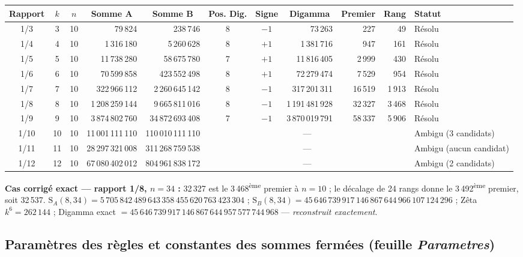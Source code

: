 \documentclass[11pt,a4paper]{article}
\newcommand{\SA}{\mathrm{S}_A}
\newcommand{\SB}{\mathrm{S}_B}
\begin{document}
\begin{center}\scriptsize
\setlength{\tabcolsep}{2pt}
\begin{tabular}{@{}c c c r r c c r r r l@{}}
\toprule
\rowcolor{spectralgris}
Rapport & $k$ & $n$ & \multicolumn{1}{c}{Somme A} & \multicolumn{1}{c}{Somme B} & Pos. Dig. & Signe & \multicolumn{1}{c}{Digamma} & \multicolumn{1}{c}{Premier} & Rang & Statut \\
\midrule
1/3 & 3 & 10 & 79\,824 & 238\,746 & 8 & $-1$ & 73\,263 & 227 & 49 & Résolu \\
1/4 & 4 & 10 & 1\,316\,180 & 5\,260\,628 & 8 & $+1$ & 1\,381\,716 & 947 & 161 & Résolu \\
1/5 & 5 & 10 & 11\,738\,280 & 58\,675\,780 & 7 & $+1$ & 11\,816\,405 & 2\,999 & 430 & Résolu \\
1/6 & 6 & 10 & 70\,599\,858 & 423\,552\,498 & 8 & $+1$ & 72\,279\,474 & 7\,529 & 954 & Résolu \\
1/7 & 7 & 10 & 322\,966\,112 & 2\,260\,645\,142 & 8 & $-1$ & 317\,201\,311 & 16\,519 & 1\,913 & Résolu \\
1/8 & 8 & 10 & 1\,208\,259\,144 & 9\,665\,811\,016 & 8 & $-1$ & 1\,191\,481\,928 & 32\,327 & 3\,468 & Résolu \\
1/9 & 9 & 10 & 3\,874\,802\,760 & 34\,872\,693\,408 & 7 & $-1$ & 3\,870\,019\,791 & 58\,337 & 5\,906 & Résolu \\
1/10 & 10 & 10 & 11\,001\,111\,110 & 110\,010\,111\,110 & \multicolumn{5}{c}{---} & Ambigu (3 candidats) \\
1/11 & 11 & 10 & 28\,297\,321\,008 & 311\,268\,759\,538 & \multicolumn{5}{c}{---} & Ambigu (aucun candidat) \\
1/12 & 12 & 10 & 67\,080\,402\,012 & 804\,961\,838\,172 & \multicolumn{5}{c}{---} & Ambigu (2 candidats) \\
\bottomrule
\end{tabular}
\end{center}

\textbf{Cas corrigé exact --- rapport 1/8, $n = 34$ :} 32\,327 est le
3\,468\textsuperscript{ème} premier à $n=10$ ; le décalage de 24 rangs donne le
3\,492\textsuperscript{ème} premier, soit 32\,537.
$\SA(8,34) = 5\,705\,842\,489\,643\,358\,455\,620\,763\,423\,304$ ;
$\SB(8,34) = 45\,646\,739\,917\,146\,867\,644\,966\,107\,124\,296$ ;
Zêta $k^{6} = 262\,144$ ; Digamma exact
$= 45\,646\,739\,917\,146\,867\,644\,957\,577\,744\,968$ --- \emph{reconstruit
exactement}.

\subsection{Paramètres des règles et constantes des sommes fermées (feuille \emph{Parametres})}
\end{document}
